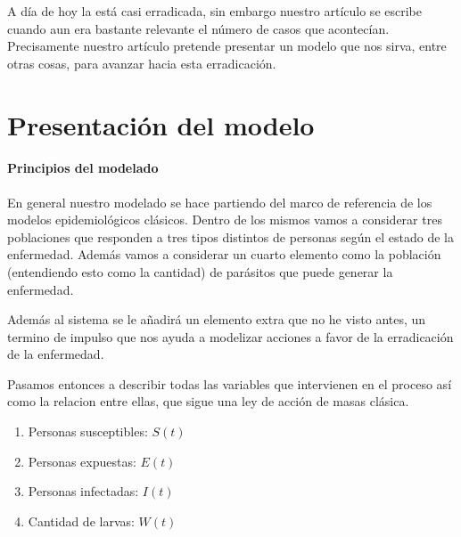 \documentclass[1p]{elsarticle}
\begin{document}
A día de hoy la  está casi erradicada, sin embargo nuestro artículo se escribe cuando aun era bastante relevante el número de casos que acontecían. Precisamente nuestro artículo pretende presentar un modelo que nos sirva, entre otras cosas, para avanzar hacia esta erradicación.

\section{Presentación del modelo}


\paragraph{Principios del modelado}

En general nuestro modelado se hace partiendo del marco de referencia de los modelos epidemiológicos clásicos. Dentro de los mismos vamos a considerar tres poblaciones que responden a tres tipos distintos de personas según el estado de la enfermedad. Además vamos a considerar un cuarto elemento como la población (entendiendo esto como la cantidad) de parásitos que puede generar la enfermedad.
 
Además al sistema se le añadirá un elemento extra que no he visto antes, un termino de impulso que nos ayuda a modelizar acciones a favor de la erradicación de la enfermedad.
 
Pasamos entonces a describir todas las variables que intervienen en el proceso así como la relacion entre ellas, que sigue una ley de acción de masas clásica.
\begin{enumerate}
\item Personas susceptibles: $S(t)$
\item Personas expuestas: $E(t)$ 
\item Personas infectadas: $I(t)$
\item Cantidad de larvas: $W(t)$
\end{enumerate}  
\end{document}
